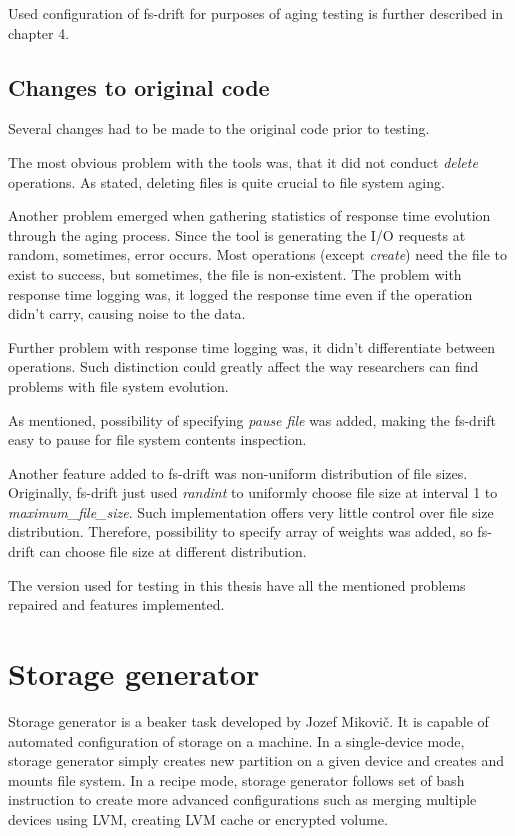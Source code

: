\documentclass[
  color, %
  table, %
  lof,   %
  lot,   %
]{fithesis3}
\begin{document}
Used configuration of fs-drift for purposes of aging testing is further described in chapter 4.

\subsection{Changes to original code}
Several changes had to be made to the original code prior to testing.

The most obvious problem with the tools was, that it did not conduct \textit{delete} operations. As stated, deleting files is quite crucial to file system aging.

Another problem emerged when gathering statistics of response time evolution through the aging process. Since the tool is generating the I/O requests at random, sometimes, error occurs. Most operations (except \textit{create}) need the file to exist to success, but sometimes, the file is non-existent. The problem with response time logging was, it logged the response time even if the operation didn't carry, causing noise to the data.

Further problem with response time logging was, it didn't differentiate between operations. Such distinction could greatly affect the way researchers can find problems with file system evolution.

As mentioned, possibility of specifying \textit{pause file} was added, making the fs-drift easy to pause for file system contents inspection.

Another feature added to fs-drift was non-uniform distribution of file sizes. Originally, fs-drift just used \textit{randint} to uniformly choose file size at interval 1 to \textit{maximum\_file\_size}. Such implementation offers very little control over file size distribution. Therefore, possibility to specify array of weights was added, so fs-drift can choose file size at different distribution.

The version used for testing in this thesis have all the mentioned problems repaired and features implemented.

\section{Storage generator}
Storage generator is a beaker task developed by Jozef Mikovič. It is capable of automated configuration of storage on a machine. In a single-device mode, storage generator simply creates new partition on a given device and creates and mounts file system. In a recipe mode, storage generator follows set of bash instruction to create more advanced configurations such as merging multiple devices using LVM, creating LVM cache or encrypted volume.
\end{document}
